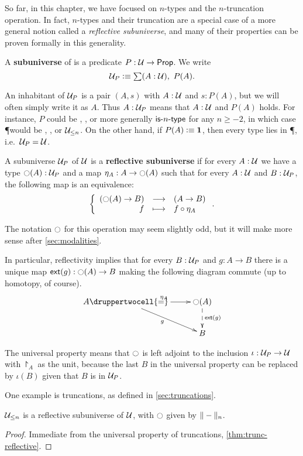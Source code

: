 So far, in this chapter, we have focused on $n$-types and the $n$-truncation operation.
In fact, $n$-types and their truncation are a special case of a more general notion called a \emph{reflective subuniverse}, and many of
their properties can be proven formally in this generality.

\begin{defn}
  A \textbf{subuniverse} of \type is a predicate $P:\type \to \prop$.
  We write
  \[\P \defeq \sm{A:\type} P(A).\]
\end{defn}

An inhabitant of $\P$ is a pair $(A,s)$ with $A:\type$ and $s:P(A)$, but we will often simply write it as $A$.
Thus $A:\P$ means that $A:\type$ and $P(A)$ holds.
For instance, $P$ could be \isprop, \isset, or more generally $\istype{n}$ for any $n\ge-2$, in which case \P would be \prop, \set, or
$\typele{n}$.
On the other hand, if $P(A)\defeq \unit$, then every type lies in \P, i.e.\ $\P=\type$.

\begin{defn}
  A subuniverse $\P$ of $\type$ is a \textbf{reflective subuniverse} if
  for every $A:\type$ we have a type $\reflect(A):\P$ and a map
  $\project_A:A\to\reflect(A)$ such that for every $A:\type$ and $B:\P$, the following map is an equivalence:
  \[\function{(\reflect(A)\to{}B)}{(A\to{}B)}{f}{f\circ\project_A}.\]
\end{defn}

The notation $\reflect$ for this operation may seem slightly odd, but it will make more sense after \autoref{sec:modalities}.

In particular, reflectivity implies that for every $B:\P$ and $g:A\to{}B$ there is a unique map $\ext(g):\reflect(A)\to{}B$ making the following
diagram commute (up to homotopy, of course).
\[\uppercurveobject{{ }}\lowercurveobject{{ }}\twocellhead{{ }}
\xymatrix{A \ar^{\project_A}[r] \ar_g[rd] \druppertwocell{=} & \reflect(A)
  \ar@{-->}^{\ext(g)}[d] \\
  & B}\]

The universal property means that $\reflect$ is left adjoint to the inclusion
$\iota:\P\to\type$ with $\project_A$ as the unit, because the last $B$ in the
universal property can be replaced by $\iota(B)$ given that $B$ is in $\P$.

One example is truncations, as defined in \autoref{sec:truncations}.
\begin{lem}%
  $\typele{n}$ is a reflective subuniverse of $\type$, with $\reflect$
  given by $\trunc{n}{-}$.
\end{lem}
\begin{proof}
  Immediate from the universal property of truncations, \autoref{thm:trunc-reflective}.
\end{proof}

